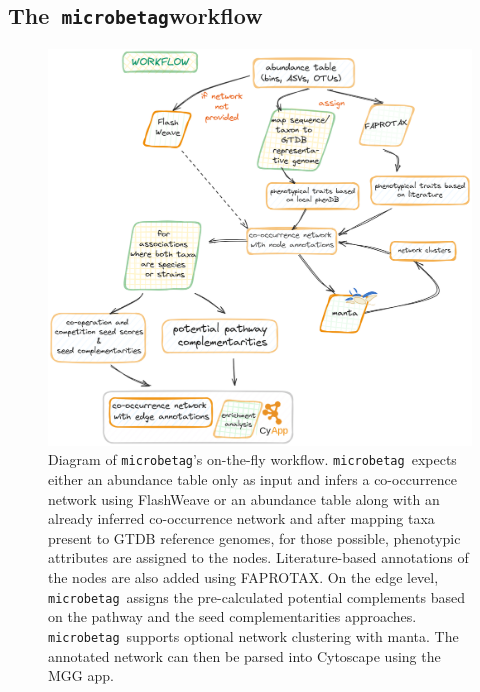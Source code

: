 \documentclass[sn-mathphys,Numbered]{sn-jnl}  %
\theoremstyle{thmstyleone}%
\theoremstyle{thmstyletwo}%
\theoremstyle{thmstylethree}%
\newcommand{\microbetag}{\texttt{microbetag}}
\begin{document}
    \subsection*{The~\microbetag \space  workflow}
    \label{subsec:app}
        \begin{figure}[h!]
            \includegraphics[width=0.9\columnwidth]{figs/microbetag-wf.png}
            \caption{
                Diagram of \microbetag's on-the-fly workflow. 
                \microbetag~expects either an abundance table only as input and infers a co-occurrence network using FlashWeave 
                or an abundance table along with an already inferred co-occurrence network 
                and after mapping taxa present to GTDB reference genomes, for those possible, phenotypic attributes are assigned to the nodes. 
                Literature-based annotations of the nodes are also added using FAPROTAX.
                On the edge level, \microbetag~assigns the pre-calculated potential complements based on the pathway and the seed complementarities approaches. 
                \microbetag~supports optional network clustering with manta.
                The annotated network can then be parsed into Cytoscape using the MGG app.
            }
            \label{fig:wf}
        \end{figure}
\end{document}
